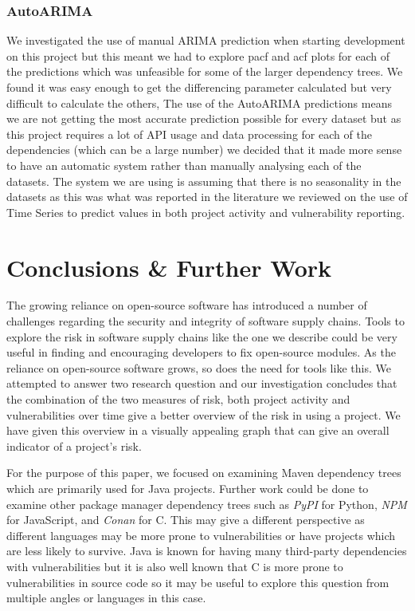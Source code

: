 \documentclass[conference]{IEEEtran}
\begin{document}
\subsubsection{AutoARIMA}
We investigated the use of manual ARIMA prediction when starting development on this project but this meant we had to explore pacf and acf plots for each of the predictions which was unfeasible for some of the larger dependency trees. We found it was easy enough to get the differencing parameter calculated but very difficult to calculate the others, The use of the AutoARIMA predictions means we are not getting the most accurate prediction possible for every dataset but as this project requires a lot of API usage and data processing for each of the dependencies (which can be a large number) we decided that it made more sense to have an automatic system rather than manually analysing each of the datasets. The system we are using is assuming that there is no seasonality in the datasets as this was what was reported in the literature we reviewed on the use of Time Series to predict values in both project activity and vulnerability reporting. 

\section{Conclusions \& Further Work}
The growing reliance on open-source software has introduced a number of challenges regarding the security and integrity of software supply chains. Tools to explore the risk in software supply chains like the one we describe could be very useful in finding and encouraging developers to fix open-source modules. As the reliance on open-source software grows, so does the need for tools like this. We attempted to answer two research question and our investigation concludes that the combination of the two measures of risk, both project activity and vulnerabilities over time give a better overview of the risk in using a project. We have given this overview in a visually appealing graph that can give an overall indicator of a project's risk. 

For the purpose of this paper, we focused on examining Maven dependency trees which are primarily used for Java projects. Further work could be done to examine other package manager dependency trees such as \textit{PyPI} for Python, \textit{NPM} for JavaScript, and \textit{Conan} for C. This may give a different perspective as different languages may be more prone to vulnerabilities or have projects which are less likely to survive. Java is known for having many third-party dependencies with vulnerabilities but it is also well known that C is more prone to vulnerabilities in source code so it may be useful to explore this question from multiple angles or languages in this case. 
\end{document}
